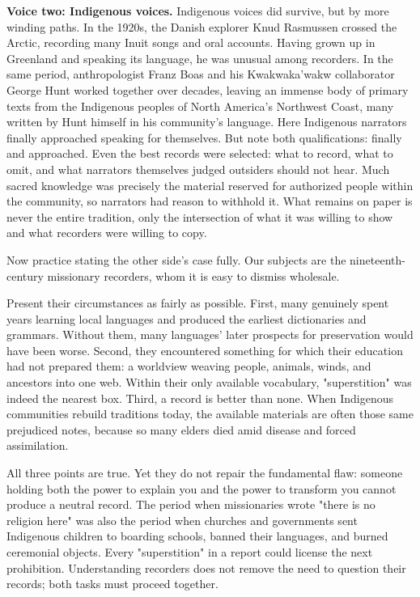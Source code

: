 \textbf{Voice two: Indigenous voices.} Indigenous voices did survive, but by more winding paths. In the 1920s, the Danish explorer Knud Rasmussen crossed the Arctic, recording many Inuit songs and oral accounts. Having grown up in Greenland and speaking its language, he was unusual among recorders. In the same period, anthropologist Franz Boas and his Kwakwaka'wakw collaborator George Hunt worked together over decades, leaving an immense body of primary texts from the Indigenous peoples of North America's Northwest Coast, many written by Hunt himself in his community's language. Here Indigenous narrators finally approached speaking for themselves. But note both qualifications: finally and approached. Even the best records were selected: what to record, what to omit, and what narrators themselves judged outsiders should not hear. Much sacred knowledge was precisely the material reserved for authorized people within the community, so narrators had reason to withhold it. What remains on paper is never the entire tradition, only the intersection of what it was willing to show and what recorders were willing to copy.

Now practice stating the other side's case fully. Our subjects are the nineteenth-century missionary recorders, whom it is easy to dismiss wholesale.

Present their circumstances as fairly as possible. First, many genuinely spent years learning local languages and produced the earliest dictionaries and grammars. Without them, many languages' later prospects for preservation would have been worse. Second, they encountered something for which their education had not prepared them: a worldview weaving people, animals, winds, and ancestors into one web. Within their only available vocabulary, "superstition" was indeed the nearest box. Third, a record is better than none. When Indigenous communities rebuild traditions today, the available materials are often those same prejudiced notes, because so many elders died amid disease and forced assimilation.

All three points are true. Yet they do not repair the fundamental flaw: someone holding both the power to explain you and the power to transform you cannot produce a neutral record. The period when missionaries wrote "there is no religion here" was also the period when churches and governments sent Indigenous children to boarding schools, banned their languages, and burned ceremonial objects. Every "superstition" in a report could license the next prohibition. Understanding recorders does not remove the need to question their records; both tasks must proceed together.

